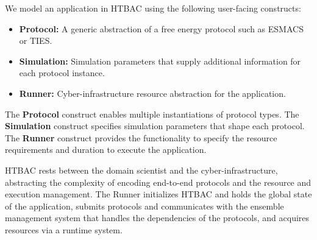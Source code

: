 
We model an application in HTBAC using the following
user-facing constructs:

\begin{itemize}
  \item \textbf{Protocol:} A generic abstraction of a free energy protocol
  such as ESMACS or TIES.
  \item \textbf{Simulation:} Simulation parameters that supply additional
  information for each protocol instance.
  \item \textbf{Runner:} Cyber-infrastructure resource abstraction for the
  application.
\end{itemize}

The \textbf{Protocol} construct  enables multiple instantiations of
protocol types. The \textbf{Simulation} construct  specifies simulation parameters that
shape each protocol. The \textbf{Runner} construct provides the functionality
to specify the resource requirements and duration to execute the application.


HTBAC rests between the domain scientist and the cyber-infrastructure,
abstracting the complexity of encoding end-to-end protocols and the resource
and execution management. The Runner initializes HTBAC and holds the global
state of the application, submits protocols and communicates with the
ensemble management system that handles the dependencies of the protocols,
and acquires resources via a runtime system.


